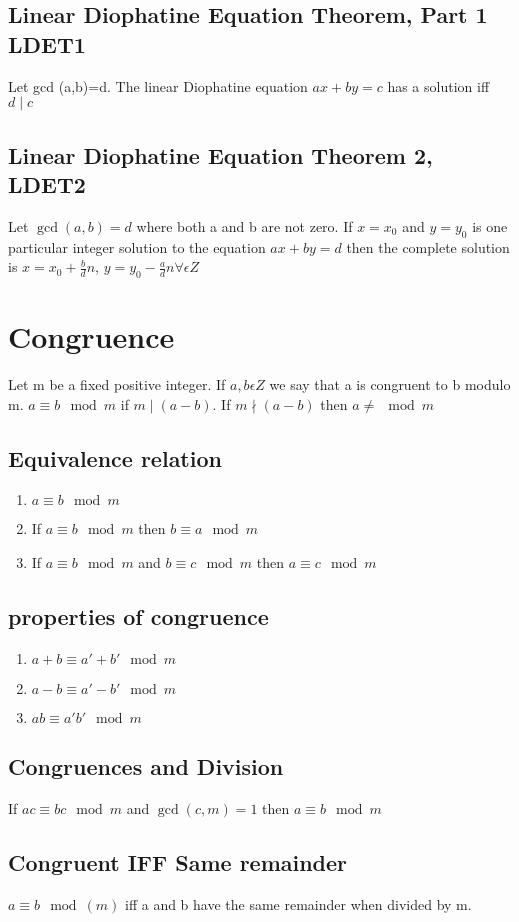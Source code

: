 \documentclass[12pt]{article}
\begin{document}
\subsection{Linear Diophatine Equation Theorem, Part 1 LDET1}
Let gcd (a,b)=d. The linear Diophatine equation $ax+by=c$ has a solution iff
$d\mid c$
\subsection{Linear Diophatine Equation Theorem 2, LDET2}
Let $\gcd(a,b)=d$ where both a and b are not zero. If $x=x_0$ and $y=y_0$ is one
particular integer solution to the equation $ax+by=d$ then the complete
solution is $x=x_0+\frac{b}{d} n$, $y=y_0-\frac{a}{d} n \forall \epsilon Z$
\section{Congruence}
Let m be a fixed positive integer. If $a,b \epsilon Z$ we say that a is
congruent to b modulo m. $a\equiv b \mod{m}$ if $m\mid (a-b)$. If $m \nmid (a-b)$
then $a\neq \mod{m}$
\subsection{Equivalence relation}
\begin{enumerate}
  \item{$a\equiv b \mod{m}$}
  \item{If $a\equiv b \mod{m} $ then $b\equiv a \mod{m}$}
  \item{If $a\equiv b \mod{m}$ and $b\equiv c \mod{m}$ then $a\equiv c \mod{m}$}
\end{enumerate}
\subsection{properties of congruence}
\begin{enumerate}
  \item{$a+b\equiv a'+b' \mod{m}$}
  \item{$a-b\equiv a'-b'\mod{m}$}
  \item{$ab\equiv a'b'\mod{m}$}
\end{enumerate}
\subsection{Congruences and Division}
If $ac\equiv bc \mod{m}$ and $\gcd(c,m)=1$ then $a\equiv b \mod{m}$
\subsection{Congruent IFF Same remainder}
$a\equiv b \mod(m)$ iff a and b have the same remainder when divided by m.
\end{document}
